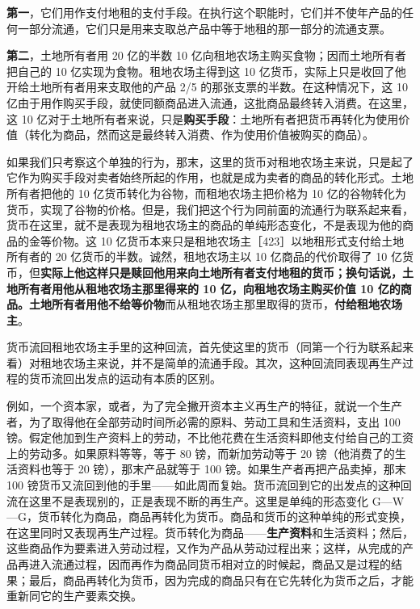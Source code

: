 \textbf{第一}，它们用作支付地租的支付手段。在执行这个职能时，它们并不使年产品的任何一部分流通，它们只是用来支取总产品中等于地租的那一部分的流通支票。

\textbf{第二}，土地所有者用 20 亿的半数 10 亿向租地农场主购买食物；因而土地所有者把自己的 10 亿实现为食物。租地农场主得到这 10 亿货币，实际上只是收回了他开给土地所有者用来支取他的产品 2/5 的那张支票的半数。在这种情况下，这 10 亿由于用作购买手段，就使同额商品进入流通，这批商品最终转入消费。在这里，这 10 亿对于土地所有者来说，只是\textbf{购买手段}：土地所有者把货币再转化为使用价值（转化为商品，然而这是最终转入消费、作为使用价值被购买的商品）。

如果我们只考察这个单独的行为，那末，这里的货币对租地农场主来说，只是起了它作为购买手段对卖者始终所起的作用，也就是成为卖者的商品的转化形式。土地所有者把他的 10 亿货币转化为谷物，而租地农场主把价格为 10 亿的谷物转化为货币，实现了谷物的价格。但是，我们把这个行为同前面的流通行为联系起来看，货币在这里，就不是表现为租地农场主的商品的单纯形态变化，不是表现为他的商品的金等价物。这 10 亿货币本来只是租地农场主［423］以地租形式支付给土地所有者的 20 亿货币的半数。诚然，租地农场主以 10 亿商品的代价取得了 10 亿货币，但\textbf{实际上他这样只是赎回他用来向土地所有者支付地租的货币；换句话说，土地所有者用他从租地农场主那里得来的 10 亿，向租地农场主购买价值 10 亿的商品。土地所有者用他不给等价物}而从租地农场主那里取得的货币，\textbf{付给租地农场主}。

货币流回租地农场主手里的这种回流，首先使这里的货币（同第一个行为联系起来看）对租地农场主来说，并不是简单的流通手段。其次，这种回流同表现再生产过程的货币流回出发点的运动有本质的区别。

例如，一个资本家，或者，为了完全撇开资本主义再生产的特征，就说一个生产者，为了取得他在全部劳动时间所必需的原料、劳动工具和生活资料，支出 100 镑。假定他加到生产资料上的劳动，不比他花费在生活资料即他支付给自己的工资上的劳动多。如果原料等等，等于 80 镑，而新加劳动等于 20 镑（他消费了的生活资料也等于 20 镑），那末产品就等于 100 镑。如果生产者再把产品卖掉，那末 100 镑货币又流回到他的手里——如此周而复始。货币流回到它的出发点的这种回流在这里不是表现别的，正是表现不断的再生产。这里是单纯的形态变化 G—W—G，货币转化为商品，商品再转化为货币。商品和货币的这种单纯的形式变换，在这里同时又表现再生产过程。货币转化为商品——\textbf{生产资料}和生活资料；然后，这些商品作为要素进入劳动过程，又作为产品从劳动过程出来；这样，从完成的产品再进入流通过程，因而再作为商品同货币相对立的时候起，商品又是过程的结果；最后，商品再转化为货币，因为完成的商品只有在它先转化为货币之后，才能重新同它的生产要素交换。


